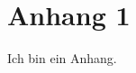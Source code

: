 
\newcommand{\appendixContent}{
    \section*{Anhang 1}
    Ich bin ein Anhang.
}



\setpagestylefoot
\renewcommand{\thefigure}{A\arabic{figure}}
\renewcommand\thelstlisting{A\arabic{lstlisting}}
\renewcommand\thetable{A\arabic{table}}





\ifliteratur
    \printbibliography
\fi


\ifanhang
    \addchap{\langanhang}
    
    \appendixContent
\fi


\ifglossar
    \printglossary[style=altlist,title=\langglossar]
\fi
